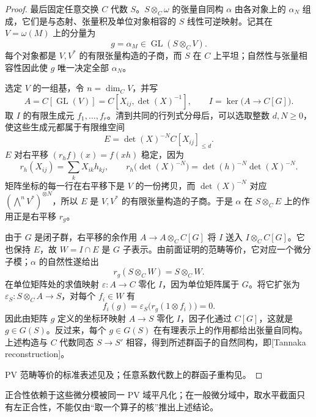 \begin{proof}
	最后固定任意交换 \(C\) 代数 \(S\)。\(S\otimes_C\omega\) 的张量自同构 \(\alpha\) 由各对象上的 \(\alpha_N\) 组成，它们是与态射、张量积及单位对象相容的 \(S\) 线性可逆映射。记其在 \(V=\omega(M)\) 上的分量为
	\[
		g=\alpha_M\in\operatorname{GL}(S\otimes_CV).
	\]
	每个对象都是 \(V,V^*\) 的有限张量构造的子商，而 \(S\) 在 \(C\) 上平坦；自然性与张量相容性因此使 \(g\) 唯一决定全部 \(\alpha_N\)。

	选定 \(V\) 的一组基，令 \(n=\dim_CV\)，并写
	\[
		A=C[\operatorname{GL}(V)]=C[X_{ij},\det(X)^{-1}], \qquad I=\ker\bigl(A\longrightarrow C[G]\bigr).
	\]
	取 \(I\) 的有限生成元 \(f_1,\ldots,f_r\)。清到共同的行列式分母后，可以选取整数 \(d,N\ge0\)，使这些生成元都属于有限维空间
	\[
		E=\det(X)^{-N}C[X_{ij}]_{\le d}.
	\]
	\(E\) 对右平移 \((r_hf)(x)=f(xh)\) 稳定，因为
	\[
		r_h(X_{ij})=\sum_kX_{ik}h_{kj}, \qquad r_h\bigl(\det(X)^{-N}\bigr)=\det(h)^{-N}\det(X)^{-N}.
	\]
	矩阵坐标的每一行在右平移下是 \(V\) 的一份拷贝，而 \(\det(X)^{-N}\) 对应 \((\bigwedge^nV^*)^{\otimes N}\)，所以 \(E\) 是 \(V,V^*\) 的有限张量构造的子商。于是 \(\alpha\) 在 \(S\otimes_CE\) 上的作用正是右平移 \(r_g\)。

	由于 \(G\) 是闭子群，右平移的余作用 \(A\to A\otimes_CC[G]\) 将 \(I\) 送入 \(I\otimes_CC[G]\)。它也保持 \(E\)，故 \(W=I\cap E\) 是 \(G\) 子表示。由前面证明的范畴等价，它对应一个微分子模；\(\alpha\) 的自然性遂给出
	\[
		r_g(S\otimes_CW)=S\otimes_CW.
	\]
	在单位矩阵处的求值映射 \(\varepsilon:A\to C\) 零化 \(I\)，因为单位矩阵属于 \(G\)。将它扩张为 \(\varepsilon_S:S\otimes_CA\to S\)，对每个 \(f_i\in W\) 有
	\[
		f_i(g)=\varepsilon_S\bigl(r_g(1\otimes f_i)\bigr)=0.
	\]
	因此由矩阵 \(g\) 定义的坐标环映射 \(A\to S\) 零化 \(I\)，因子化通过 \(C[G]\)，这就是 \(g\in G(S)\)。反过来，每个 \(g\in G(S)\) 在有理表示上的作用都给出张量自同构。上述构造与 \(C\) 代数同态 \(S\to S'\) 相容，得到所述群函子的自然同构，即[Tannaka reconstruction]。

	PV 范畴等价的标准表述见\cite[Theorem 1.5.2, p. 41]{Singer2009DifferentialGalois}及\cite[Theorem 2.33]{VanDerPutSinger2003GaloisTheory}；任意系数代数上的群函子重构见\cite[Theorem B.20]{VanDerPutSinger2003GaloisTheory}。
\end{proof}

正合性依赖于这些微分模被同一 PV 域平凡化；在一般微分域中，取水平截面只有左正合性，不能仅由“取一个算子的核”推出上述结论。

